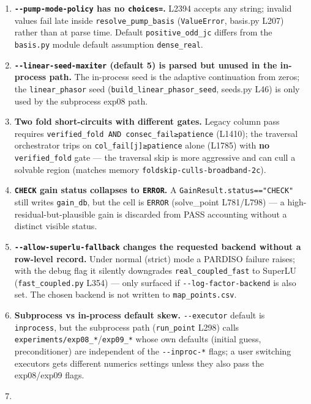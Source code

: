 \documentclass[
  10pt,
]{article}
\providecommand{\tightlist}{%
  \setlength{\itemsep}{0pt}\setlength{\parskip}{0pt}}
\begin{document}
\begin{enumerate}
\def\labelenumi{\arabic{enumi}.}
\tightlist
\item
  \textbf{\texttt{-\/-pump-mode-policy} has no \texttt{choices=}.} L2394
  accepts any string; invalid values fail late inside
  \texttt{resolve\_pump\_basis} (\texttt{ValueError}, basis.py L207)
  rather than at parse time. Default \texttt{positive\_odd\_jc} differs
  from the \texttt{basis.py} module default assumption
  \texttt{dense\_real}.
\item
  \textbf{\texttt{-\/-linear-seed-maxiter} (default 5) is parsed but
  unused in the in-process path.} The in-process seed is the adaptive
  continuation from zeros; the \texttt{linear\_phasor} seed
  (\texttt{build\_linear\_phasor\_seed}, seeds.py L46) is only used by
  the subprocess exp08 path.
\item
  \textbf{Two fold short-circuits with different gates.} Legacy column
  pass requires \texttt{verified\_fold\ AND\ consec\_fail≥patience}
  (L1410); the traversal orchestrator trips on
  \texttt{col\_fail{[}j{]}≥patience} alone (L1785) with \textbf{no}
  \texttt{verified\_fold} gate --- the traversal skip is more aggressive
  and can cull a solvable region (matches memory
  \texttt{foldskip-culls-broadband-2c}).
\item
  \textbf{\texttt{CHECK} gain status collapses to \texttt{ERROR}.} A
  \texttt{GainResult.status=="CHECK"} still writes \texttt{gain\_db},
  but the cell is \texttt{ERROR} (solve\_point L781/L798) --- a
  high-residual-but-plausible gain is discarded from PASS accounting
  without a distinct visible status.
\item
  \textbf{\texttt{-\/-allow-superlu-fallback} changes the requested
  backend without a row-level record.} Under normal (strict) mode a
  PARDISO failure raises; with the debug flag it silently downgrades
  \texttt{real\_coupled\_fast} to SuperLU (\texttt{fast\_coupled.py}
  L354) --- only surfaced if \texttt{-\/-log-factor-backend} is also
  set. The chosen backend is not written to \texttt{map\_points.csv}.
\item
  \textbf{Subprocess vs in-process default skew.} \texttt{-\/-executor}
  default is \texttt{inprocess}, but the subprocess path
  (\texttt{run\_point} L298) calls
  \texttt{experiments/exp08\_*}/\texttt{exp09\_*} whose own defaults
  (initial guess, preconditioner) are independent of the
  \texttt{-\/-inproc-*} flags; a user switching executors gets different
  numerics settings unless they also pass the exp08/exp09 flags.
\item

\end{enumerate}
\end{document}
